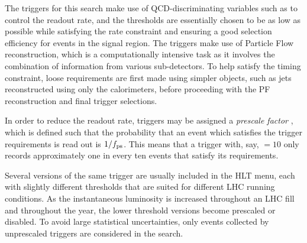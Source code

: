The triggers for this search make use of QCD-discriminating variables such as 
\alphat to control the readout rate, and the thresholds are essentially chosen 
to be as low as possible while satisfying the rate constraint and ensuring a 
good selection efficiency for events in the signal region.
The triggers make use of Particle Flow reconstruction, which is a 
computationally intensive task as it involves the combination of information 
from various sub-detectors. To help satisfy the timing constraint, loose 
requirements are first made using simpler objects, such as jets reconstructed 
using only the calorimeters, before proceeding with the PF reconstruction and 
final trigger selections.

In order to reduce the readout rate, triggers may be assigned a 
\textit{prescale factor} \prescale, which is defined such that the probability 
that an event which satisfies the trigger requirements is read out is 
$1/f_{\text{ps}}$. This means that a trigger with, say, \prescale$=10$ only records 
approximately one in every ten events that satisfy its requirements.

Several versions of the same trigger are usually included in the HLT menu, each 
with slightly different thresholds that are suited for different LHC running 
conditions. As the instantaneous luminosity is increased throughout an LHC fill 
and throughout the year, the lower threshold versions become prescaled or 
disabled. To avoid large statistical uncertainties, only events collected by 
unprescaled triggers are considered in the search.


